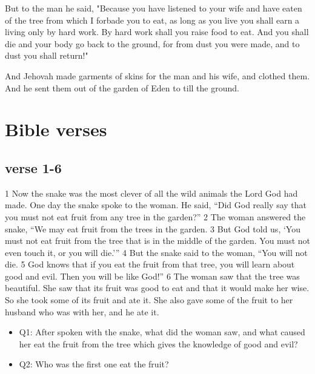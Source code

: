 But to the man he said, "Because you have listened to your wife and have eaten of the tree from which I forbade you to eat, as long as you live you shall earn a living only by hard work. By hard work shall you raise food to eat. And you shall die and your body go back to the ground, for from dust you were made, and to dust you shall return!"

And Jehovah made garments of skins for the man and his wife, and clothed them. And he sent them out of the garden of Eden to till the ground.
\fi






\section{Bible verses}
\subsection{verse 1-6}
\large{
1 Now the snake was the most clever of all the wild animals the Lord God had made. One day the snake spoke to the woman. He said, “Did God really say that you must not eat fruit from any tree in the garden?” 2 The woman answered the snake, “We may eat fruit from the trees in the garden. 3 But God told us, ‘You must not eat fruit from the tree that is in the middle of the garden. You must not even touch it, or you will die.’” 4 But the snake said to the woman, “You will not die. 5 God knows that if you eat the fruit from that tree, you will learn about good and evil. Then you will be like God!” 6 The woman saw that the tree was beautiful. She saw that its fruit was good to eat and that it would make her wise. So she took some of its fruit and ate it. She also gave some of the fruit to her husband who was with her, and he ate it.}
\begin{itemize}
\item Q1: After spoken with the snake, what did the woman saw, and what caused her eat the fruit from the tree which gives the knowledge of good and evil?
\item Q2: Who was the first one eat the fruit?
\end{itemize}


